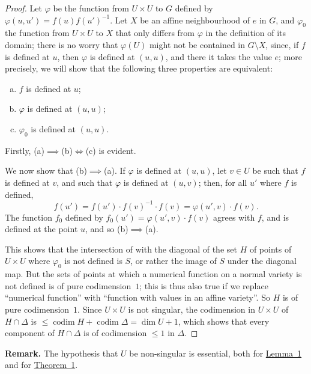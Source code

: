 \documentclass{article}
\newenvironment{rmenv}[1]
  {\phantomsection\par\medskip\noindent\textbf{#1.}\rmfamily}
  {\medskip}
\renewcommand{\leq}{\leqslant}
\DeclareMathOperator{\codim}{codim}
\newcommand{\oldpage}[1]{\marginpar{\footnotesize$\Big\vert$ \textit{p.~#1}}}
\begin{document}
\begin{proof}
  Let $\varphi$ be the function from $U\times U$ to $G$ defined by $\varphi(u,u')=f(u)f(u')^{-1}$.
  Let $X$ be an affine neighbourhood of $e$ in $G$, and $\varphi_0$ the function from $U\times U$ to $X$ that only differs from $\varphi$ in the definition of its domain;
  there is no worry that $\varphi(U)$ might not be contained in $G\setminus X$, since, if $f$ is defined at $u$, then $\varphi$ is defined at $(u,u)$, and there it takes the value $e$;
  more precisely, we will show that the following three properties are equivalent:
  \begin{enumerate}[(a)]
    \item $f$ is defined at $u$;
    \item $\varphi$ is defined at $(u,u)$;
    \item $\varphi_0$ is defined at $(u,u)$.
  \end{enumerate}

  Firstly, (a)$\implies$(b)$\iff$(c) is evident.

  We now show that (b)$\implies$(a).
  If $\varphi$ is defined at $(u,u)$, let $v\in U$ be such that $f$ is defined at $v$, and such that $\varphi$ is defined at $(u,v)$;
  then, for all $u'$ where $f$ is defined,
  \[
    f(u') = f(u')\cdot f(v)^{-1}\cdot f(v) = \varphi(u',v)\cdot f(v).
  \]
  The function $f_0$ defined by $f_0(u')=\varphi(u',v)\cdot f(v)$ agrees with $f$, and is
\oldpage{9-04}
  defined at the point $u$, and so (b)$\implies$(a).

  This shows that the intersection of with the diagonal of the set $H$ of points of $U\times U$ where $\varphi_0$ is not defined is $S$, or rather the image of $S$ under the diagonal map.
  But the sets of points at which a numerical function on a normal variety is not defined is of pure codimension~$1$;
  this is thus also true if we replace ``numerical function'' with ``function with values in an affine variety''.
  So $H$ is of pure codimension~$1$.
  Since $U\times U$ is not singular, the codimension in $U\times U$ of $H\cap\Delta$ is $\leq\codim H+\codim\Delta = \dim U+1$, which shows that every component of $H\cap\Delta$ is of codimension $\leq1$ in $\Delta$.
\end{proof}

\begin{rmenv}{Remark}
  The hypothesis that $U$ be non-singular is essential, both for \hyperref[lemma1]{Lemma~1} and for \hyperref[theorem1]{Theorem~1}.
\end{rmenv}
\end{document}
